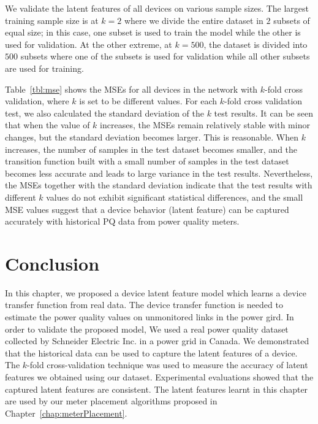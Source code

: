 We validate the latent features of all devices on various sample sizes. The largest training sample size is at $k=2$ where we divide the entire dataset in $2$ subsets of equal size; in this case, one subset is used to train the model while the other is used for validation. At the other extreme, at $k=500$, the dataset is divided into $500$ subsets where one of the subsets is used for validation while all other subsets are used for training.

Table~\ref{tbl:mse} shows the MSEs for all devices in the network with $k$-fold cross validation, where $k$ is set to be different values. For each $k$-fold cross validation test, we also calculated the standard deviation of the $k$ test results. It can be seen that when the value of $k$ increases, the MSEs remain relatively stable with minor changes, but the standard deviation becomes larger. This is reasonable. When $k$ increases, the number of samples in the test dataset becomes smaller, and the transition function built with a small number of samples in the test dataset becomes less accurate and leads to large variance in the test results. Nevertheless, the MSEs together with the standard deviation indicate that the test results with different $k$ values do not exhibit significant statistical differences, and the small MSE values suggest that a device behavior (latent feature) can be captured accurately with historical PQ data from power quality meters.

\section{Conclusion}
In this chapter, we proposed a device latent feature model which learns a device transfer function from real data. The device transfer function is needed to estimate the power quality values on unmonitored links in the power gird. In order to validate the proposed model, We used a real power quality dataset collected by Schneider Electric Inc. in a power grid in Canada. We demonstrated that the historical data can be used to capture the latent features of a device. The $k$-fold cross-validation technique was used to measure the accuracy of latent features we obtained using our dataset. Experimental evaluations showed that the captured latent features are consistent. The latent features learnt in this chapter are used by our meter placement algorithms proposed in Chapter~\ref{chap:meterPlacement}.